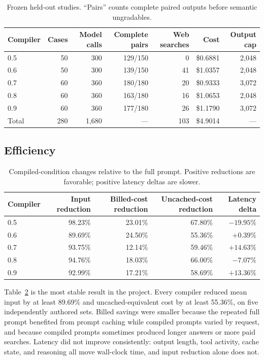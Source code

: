\documentclass[11pt]{article}
\begin{document}
\begin{table}[t]
\centering
\caption{Frozen held-out studies. ``Pairs'' counts complete paired outputs before semantic ungradables.}
\label{tab:studies}
\small
\begin{tabular}{lrrrrrr}
\toprule
Compiler & Cases & Model calls & Complete pairs & Web searches & Cost & Output cap \\
\midrule
0.5 & 50 & 300 & 129/150 & 0 & \$0.6881 & 2,048 \\
0.6 & 50 & 300 & 139/150 & 41 & \$1.0357 & 2,048 \\
0.7 & 60 & 360 & 180/180 & 20 & \$0.9333 & 3,072 \\
0.8 & 60 & 360 & 163/180 & 16 & \$1.0653 & 2,048 \\
0.9 & 60 & 360 & 177/180 & 26 & \$1.1790 & 3,072 \\
\midrule
Total & 280 & 1,680 & --- & 103 & \$4.9014 & --- \\
\bottomrule
\end{tabular}
\end{table}

\subsection{Efficiency}

\begin{table}[t]
\centering
\caption{Compiled-condition changes relative to the full prompt. Positive reductions are favorable; positive latency deltas are slower.}
\label{tab:efficiency}
\small
\begin{tabular}{lrrrr}
\toprule
Compiler & Input reduction & Billed-cost reduction & Uncached-cost reduction & Latency delta \\
\midrule
0.5 & 98.23\% & 23.01\% & 67.80\% & $-19.95\%$ \\
0.6 & 89.69\% & 24.50\% & 55.36\% & $+0.39\%$ \\
0.7 & 93.75\% & 12.14\% & 59.46\% & $+14.63\%$ \\
0.8 & 94.76\% & 18.03\% & 66.00\% & $-7.07\%$ \\
0.9 & 92.99\% & 17.21\% & 58.69\% & $+13.36\%$ \\
\bottomrule
\end{tabular}
\end{table}

Table~\ref{tab:efficiency} is the most stable result in the project. Every compiler reduced mean input by at least 89.69\% and uncached-equivalent cost by at least 55.36\%, on five independently authored sets. Billed savings were smaller because the repeated full prompt benefited from prompt caching while compiled prompts varied by request, and because compiled prompts sometimes produced longer answers or more paid searches. Latency did not improve consistently: output length, tool activity, cache state, and reasoning all move wall-clock time, and input reduction alone does not.
\end{document}
